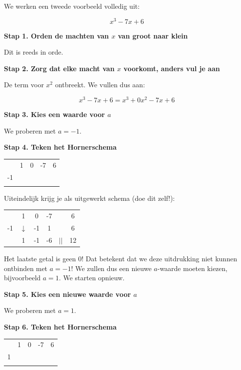 \begin{voorbeeld}
	We werken een tweede voorbeeld volledig uit:
	
	\begin{equation*}
	x^3-7x+6
	\end{equation*}

\textbf{Stap 1. Orden de machten van $x$ van groot naar klein}

Dit is reeds in orde.

\textbf{Stap 2. Zorg dat elke macht van $x$ voorkomt, anders vul je aan}

De term voor $x^2$ ontbreekt. We vullen dus aan: 

\begin{equation*}
x^3-7x+6 = x^3+0x^2-7x+6
\end{equation*}

\textbf{Stap 3. Kies een waarde voor $a$}

We proberen met $a=-1$.


\textbf{Stap 4. Teken het Hornerschema}

\begin{center}
	\begin{tabular}{c|cccc}
		& 1 & 0 & -7 & 6 \\
		-1 &  &  &  & \\
		\hline 
		&  &  &  & 
	\end{tabular}
\end{center}

Uiteindelijk krijg je als uitgewerkt schema (doe dit zelf!):

\begin{center}
	\begin{tabular}{c|ccccc}
		& 1 & 0 & -7 & & 6 \\
		-1 & $\downarrow$ & -1 & 1 & & 6\\
		\hline 
		& 1 & -1 & -6 & $||$ & 12
	\end{tabular}
\end{center}

Het laatste getal is geen 0! Dat betekent dat we deze uitdrukking niet kunnen ontbinden met $a=-1$! We zullen dus een nieuwe $a$-waarde moeten kiezen, bijvoorbeeld $a=1$. We starten opnieuw.

\textbf{Stap 5. Kies een nieuwe waarde voor $a$}


We proberen met $a=1$.

\textbf{Stap 6. Teken het Hornerschema}

\begin{center}
	\begin{tabular}{c|cccc}
		& 1 & 0 & -7 & 6 \\
		1 &  &  &  & \\
		\hline 
		&  &  &  & 
	\end{tabular}
\end{center}


\end{voorbeeld}
